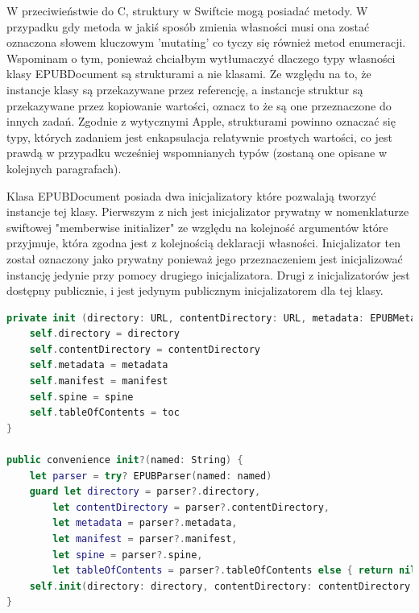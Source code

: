 W przeciwieństwie do C, struktury w Swiftcie mogą posiadać metody. W przypadku gdy metoda w jakiś sposób zmienia własności musi ona zostać oznaczona słowem kluczowym 'mutating' co tyczy się również metod enumeracji. Wspominam o tym, ponieważ chciałbym wytłumaczyć dlaczego typy własności klasy EPUBDocument są strukturami a nie klasami. Ze względu na to, że instancje klasy są przekazywane przez referencję, a instancje struktur są przekazywane przez kopiowanie wartości, oznacz to że są one przeznaczone do innych zadań. Zgodnie z wytycznymi Apple, strukturami powinno oznaczać się typy, których zadaniem jest enkapsulacja relatywnie prostych wartości\cite{theSwiftProgrammingLanguageStructsPurpose}, co jest prawdą w przypadku wcześniej wspomnianych typów (zostaną one opisane w kolejnych paragrafach).

Klasa EPUBDocument posiada dwa inicjalizatory które pozwalają tworzyć instancje tej klasy. Pierwszym z nich jest inicjalizator prywatny w nomenklaturze swiftowej "memberwise initializer" ze względu na kolejność argumentów które przyjmuje, która zgodna jest z kolejnością deklaracji własności. Inicjalizator ten został oznaczony jako prywatny ponieważ jego przeznaczeniem jest inicjalizować instancję jedynie przy pomocy drugiego inicjalizatora. Drugi z inicjalizatorów jest dostępny publicznie, i jest jedynym publicznym inicjalizatorem dla tej klasy.

\begin{lstlisting}[caption={Inicjalizatory klasy EPUBDocument.}, language=swift]
private init (directory: URL, contentDirectory: URL, metadata: EPUBMetadata, manifest: EPUBManifest, spine: EPUBSpine, toc: EPUBTableOfContents) {
    self.directory = directory
    self.contentDirectory = contentDirectory
    self.metadata = metadata
    self.manifest = manifest
    self.spine = spine
    self.tableOfContents = toc
}

public convenience init?(named: String) {
    let parser = try? EPUBParser(named: named)
    guard let directory = parser?.directory,
        let contentDirectory = parser?.contentDirectory,
        let metadata = parser?.metadata,
        let manifest = parser?.manifest,
        let spine = parser?.spine,
        let tableOfContents = parser?.tableOfContents else { return nil }
    self.init(directory: directory, contentDirectory: contentDirectory, metadata: metadata, manifest: manifest, spine: spine, toc: tableOfContents)
}
\end{lstlisting}

